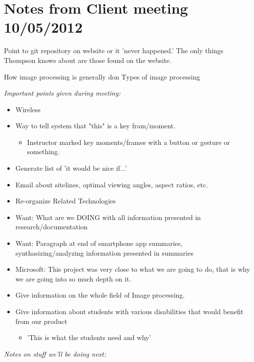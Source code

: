 \documentclass[]{article}
\begin{document}
	\section{Notes from Client meeting 10/05/2012}
	Point to git repository on website or it 'never happened.' The only things Thompson knows about are those found on the website.
	
	How image processing is generally don
	Types of image processing
	
	\emph{Important points given during meeting:}
		\begin{itemize}
			\item Wireless
			\item Way to tell system that "this" is a key fram/moment.
			\begin{itemize}
				\item Instructor marked key moments/frames with a button or gesture or something.
			\end{itemize}
			\item Generate list of 'it would be nice if...'
			\item Email about sitelines, optimal viewing angles, aspect ratios, etc.
			\item Re-organize Related Technologies
			\item Want: What are we DOING with all information presented in research/documentation
			\item Want: Paragraph at end of smartphone app summaries, synthasizing/analyzing information presented in summaries
			\item Microsoft: This project was very close to what we are going to do, that is why we are going into so much depth on it.
			\item Give information on the whole field of Image processing.
			\item Give information about students with various disabilities that would benefit from our product
			\begin{itemize}
				\item 'This is what the students need and why'
			\end{itemize}
		\end{itemize}
	\emph{Notes on stuff we'll be doing next:}
\end{document}
